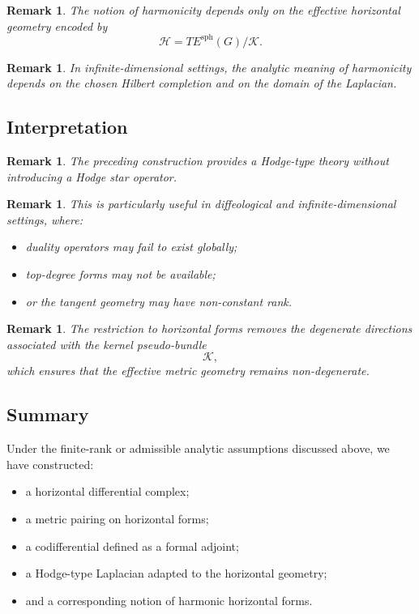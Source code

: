 \documentclass[11pt]{amsart}
\newtheorem{remark}[theorem]{Remark}
\begin{document}
\begin{remark}
The notion of harmonicity depends only on the effective horizontal geometry
encoded by
\[
\mathcal H
=
TE^{\mathrm{sph}}(G)/\mathcal K.
\]
\end{remark}

\begin{remark}
In infinite-dimensional settings, the analytic meaning of harmonicity depends
on the chosen Hilbert completion and on the domain of the Laplacian.
\end{remark}

\subsection{Interpretation}

\begin{remark}
The preceding construction provides a Hodge-type theory without introducing a
Hodge star operator.
\end{remark}

\begin{remark}
This is particularly useful in diffeological and infinite-dimensional
settings, where:
\begin{itemize}
\item duality operators may fail to exist globally;
\item top-degree forms may not be available;
\item or the tangent geometry may have non-constant rank.
\end{itemize}
\end{remark}

\begin{remark}
The restriction to horizontal forms removes the degenerate directions
associated with the kernel pseudo-bundle
\[
\mathcal K,
\]
which ensures that the effective metric geometry remains non-degenerate.
\end{remark}

\subsection{Summary}

Under the finite-rank or admissible analytic assumptions discussed above, we
have constructed:
\begin{itemize}
\item a horizontal differential complex;
\item a metric pairing on horizontal forms;
\item a codifferential defined as a formal adjoint;
\item a Hodge-type Laplacian adapted to the horizontal geometry;
\item and a corresponding notion of harmonic horizontal forms.
\end{itemize}
\end{document}
